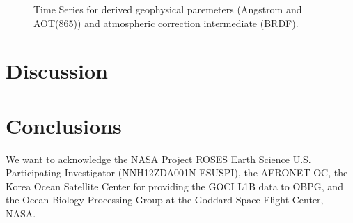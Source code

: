 \documentclass[12pt]{spieman}  %
\begin{document}
\begin{spacing}{2}
\begin{figure}[htb!]
    \caption{Time Series for derived geophysical paremeters (Angstrom and AOT(865)) and atmospheric correction intermediate (BRDF). \label{fig:GOCI_TimeSeries_intermed_par} } 
\end{figure}

\section{Discussion}

\section{Conclusions}


\acknowledgments 
We want to acknowledge the NASA Project ROSES Earth Science U.S. Participating Investigator (NNH12ZDA001N-ESUSPI), the AERONET-OC, the Korea Ocean Satellite Center for providing the GOCI L1B data to OBPG, and the Ocean Biology Processing Group at the Goddard Space Flight Center, NASA. 
 






\end{spacing}
\end{document}

